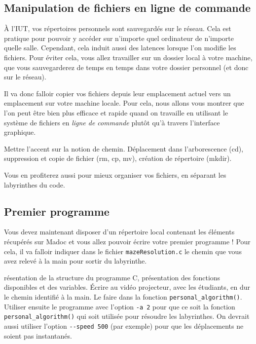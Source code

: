 \documentclass[a4paper]{article}
\newenvironment{enseignants}[1]{\noindent\color{blue}{\bf #1}}{}
\begin{document}
\subsection{Manipulation de fichiers en ligne de commande}

À l'IUT, vos répertoires personnels sont sauvegardés sur le réseau. Cela est pratique pour pouvoir y accéder sur n'importe quel ordinateur de n'importe quelle salle. Cependant, cela induit aussi des latences lorsque l'on modifie les fichiers.
Pour éviter cela, vous allez travailler sur un dossier local à votre machine, que vous sauvegarderez de temps en temps dans votre dossier personnel (et donc sur le réseau).

Il va donc falloir copier vos fichiers depuis leur emplacement actuel vers un emplacement sur votre machine locale. Pour cela, nous allons vous montrer que l’on peut être bien plus efficace et rapide quand on travaille en utilisant le système de fichiers en \emph{ligne de commande} plutôt qu'à travers l’interface graphique.

\begin{enseignants}{Système de fichiers~:}
  Mettre l'accent sur la notion de chemin.
  Déplacement dans l’arborescence (cd), suppression et copie de fichier (rm, cp, mv), création de répertoire (mkdir).
\end{enseignants}

Vous en profiterez aussi pour mieux organiser vos fichiers, en séparant les labyrinthes du code.

\subsection{Premier programme}

Vous devez maintenant disposer d’un répertoire local contenant les éléments récupérés sur Madoc et vous allez pouvoir écrire votre premier programme !
Pour cela, il va falloir indiquer dans le fichier \texttt{mazeResolution.c} le chemin que vous avez relevé à la main pour sortir du labyrinthe.

\begin{enseignants}
  Présentation de la structure du programme C, présentation des fonctions disponibles et des variables. Écrire au vidéo projecteur, avec les étudiants, en dur le chemin identifié à la main.
  Le faire dans la fonction \verb|personal_algorithm()|.
  Utiliser ensuite le programme avec l'option \verb|-a 2| pour que ce soit la fonction \verb|personal_algorithm()| qui soit utilisée pour résoudre les labyrinthes.
  On devrait aussi utiliser l'option \verb|--speed 500| (par exemple) pour que les déplacements ne soient pas instantanés.
\end{enseignants}
\end{document}
